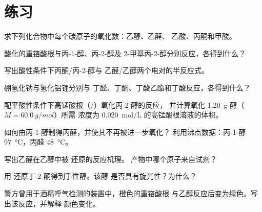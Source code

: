 \section{练习}

\begin{exercise}[$\star$]\label{exo:b1:organic-redox:1}
求下列化合物中每个碳原子的氧化数：乙醇、乙醛、
乙酸、丙酮和甲酸。
\end{exercise}

\begin{exercise}[$\star$]\label{exo:b1:organic-redox:2}
酸化的重铬酸根与丙-1-醇、丙-2-醇及
2-甲基丙-2-醇分别反应，各得到什么？
\end{exercise}

\begin{exercise}[$\star$]\label{exo:b1:organic-redox:3}
写出酸性条件下丙酮/丙-2-醇与
乙醛/乙醇两个电对的半反应式。
\end{exercise}

\begin{exercise}[$\star$]\label{exo:b1:organic-redox:4}
硼氢化钠与氢化铝锂分别与
丁醛、丁酮、丁酸乙酯和丁酸反应，各得到什么？
\end{exercise}

\begin{exercise}[$\star\star$]\label{exo:b1:organic-redox:5}
配平酸性条件下高锰酸根（/）氧化丙-2-醇的反应，
并计算氧化 \qty{1.20}{g} 醇（$M = \qty{60.0}{g/mol}$）所需
浓度为 \qty{0.020}{mol/L} 的高锰酸根溶液的体积。
\end{exercise}

\begin{exercise}[$\star\star$]\label{exo:b1:organic-redox:6}
如何由丙-1-醇制得丙醛，并使其不再被进一步氧化？
利用沸点数据：丙-1-醇 \qty{97}{\celsius}，丙醛
\qty{48}{\celsius}。
\end{exercise}

\begin{exercise}[$\star\star$]\label{exo:b1:organic-redox:7}
写出乙醛在乙醇中被  还原的反应机理。
产物中哪个原子来自试剂？
\end{exercise}

\begin{exercise}[$\star\star$]\label{exo:b1:organic-redox:8}
用  还原丁-2-酮得到手性醇。该醇
是否具有旋光性？为什么？
\end{exercise}

\begin{exercise}[$\star\star$]\label{exo:b1:organic-redox:9}
警方曾用于酒精呼气检测的装置中，橙色的重铬酸根
与乙醇反应后变为绿色。写出该反应，并解释
颜色变化。
\end{exercise}

